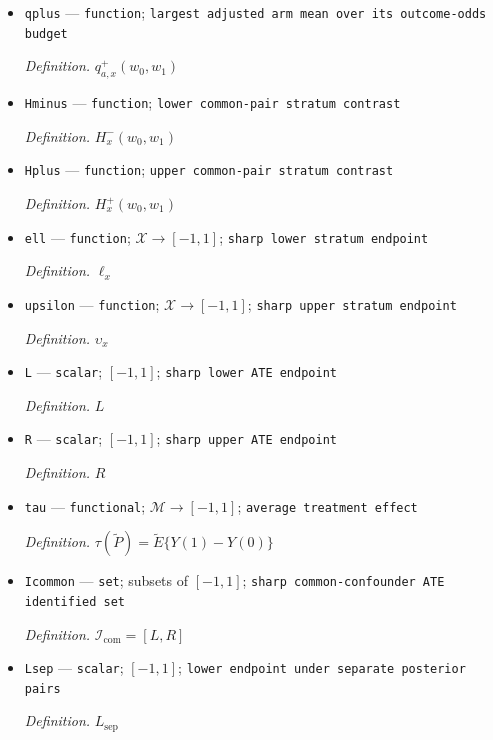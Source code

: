 \documentclass{article}
\begin{document}
\begin{itemize}
  \par\smallskip\noindent\emph{Definition.} \(q^-_{a,x}(w_0,w_1)\)
  \item \texttt{qplus} --- \texttt{function}; \texttt{largest adjusted arm mean over its outcome-\allowbreak{}odds budget}
  \par\smallskip\noindent\emph{Definition.} \(q^+_{a,x}(w_0,w_1)\)
  \item \texttt{Hminus} --- \texttt{function}; \texttt{lower common-\allowbreak{}pair stratum contrast}
  \par\smallskip\noindent\emph{Definition.} \(H^-_x(w_0,w_1)\)
  \item \texttt{Hplus} --- \texttt{function}; \texttt{upper common-\allowbreak{}pair stratum contrast}
  \par\smallskip\noindent\emph{Definition.} \(H^+_x(w_0,w_1)\)
  \item \texttt{ell} --- \texttt{function}; \(\mathcal X\to[-1,1]\); \texttt{sharp lower stratum endpoint}
  \par\smallskip\noindent\emph{Definition.} \(\ell_x\)
  \item \texttt{upsilon} --- \texttt{function}; \(\mathcal X\to[-1,1]\); \texttt{sharp upper stratum endpoint}
  \par\smallskip\noindent\emph{Definition.} \(\upsilon_x\)
  \item \texttt{L} --- \texttt{scalar}; \([-1,1]\); \texttt{sharp lower ATE endpoint}
  \par\smallskip\noindent\emph{Definition.} \(L\)
  \item \texttt{R} --- \texttt{scalar}; \([-1,1]\); \texttt{sharp upper ATE endpoint}
  \par\smallskip\noindent\emph{Definition.} \(R\)
  \item \texttt{tau} --- \texttt{functional}; \(\mathcal M\to[-1,1]\); \texttt{average treatment effect}
  \par\smallskip\noindent\emph{Definition.} \(\tau(\widetilde P)=\widetilde E\{Y(1)-Y(0)\}\)
  \item \texttt{Icommon} --- \texttt{set}; subsets of \([-1,1]\); \texttt{sharp common-\allowbreak{}confounder ATE identified set}
  \par\smallskip\noindent\emph{Definition.} \(\mathcal I_{\mathrm{com}}=[L,R]\)
  \item \texttt{Lsep} --- \texttt{scalar}; \([-1,1]\); \texttt{lower endpoint under separate posterior pairs}
  \par\smallskip\noindent\emph{Definition.} \(L_{\mathrm{sep}}\)

\end{itemize}
\end{document}
